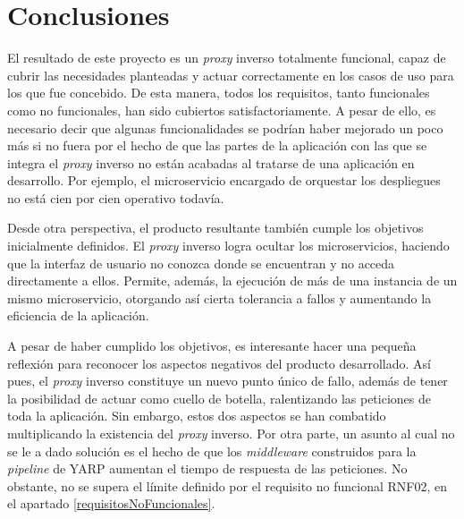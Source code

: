 \documentclass[11pt,spanish,listoffigures]{tfgetsinf}
\begin{document}

\chapter{Conclusiones}

El resultado de este proyecto es un \emph{proxy} inverso totalmente funcional, capaz de cubrir las
necesidades planteadas y actuar correctamente en los casos de uso para los que fue concebido. De esta manera, todos los requisitos, tanto funcionales como no funcionales, han sido cubiertos satisfactoriamente. A pesar de ello, es necesario decir que algunas funcionalidades se podrían haber mejorado un poco más si no fuera por el hecho de que las partes de la aplicación con las que se integra el \emph{proxy} inverso no están acabadas al tratarse de una aplicación en desarrollo. Por ejemplo, el microservicio encargado de orquestar los despliegues no está cien por cien operativo todavía.

Desde otra perspectiva, el producto resultante también cumple los objetivos inicialmente definidos. El \emph{proxy} inverso logra ocultar los microservicios, haciendo que la interfaz de usuario no conozca donde se encuentran y no acceda directamente a ellos. Permite, además, la ejecución de más de una instancia de un mismo microservicio, otorgando así cierta tolerancia a fallos y aumentando la eficiencia de la aplicación.

A pesar de haber cumplido los objetivos, es interesante hacer una pequeña reflexión para reconocer los aspectos negativos del producto desarrollado. Así pues, el \emph{proxy} inverso constituye un nuevo punto único de fallo, además de tener la posibilidad de actuar como cuello de botella, ralentizando las peticiones de toda la aplicación. Sin embargo, estos dos aspectos se han combatido multiplicando la existencia del \emph{proxy} inverso. Por otra parte, un asunto al cual no se le a dado solución es el hecho de que los \emph{middleware} construidos para la \emph{pipeline} de YARP aumentan el tiempo de respuesta de las peticiones. No obstante, no se supera el límite definido por el requisito no funcional RNF02, en el apartado \ref{requisitosNoFuncionales}.
\end{document}
